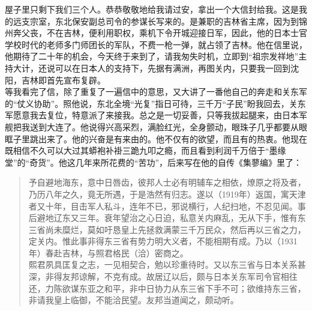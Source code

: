 屋子里只剩下我们三个人。恭恭敬敬地给我请过安，拿出一个大信封给我。这是我的远支宗室，东北保安副总司令的参谋长写来的。是兼职的吉林省主席，因为到锦州奔父丧，不在吉林，便利用职权，乘机下令开城迎接日军，因此，他的日本士官学校时代的老师多门师团长的军队，不费一枪一弹，就占领了吉林。他在信里说，他期待了二十年的机会，今天终于来到了，请我匆失时机，立即到“祖宗发祥地”主持大计，还说可以在日本人的支持下，先据有满洲，再图关内，只要我一回到沈阳，吉林即首先宣布复辟。\\

等我看完了信，除了重复了一遍信中的意思，又大讲了一番他自己的奔走和关东军的“仗义协助”。照他说，东北全境“光复”指日可待，三千万“子民”盼我回去，关东军愿意我去复位，特意派了来接我。总之是一切妥善，只等我拔起腿来，由日本军舰把我送到大连了。他说得兴高采烈，满脸红光，全身颤动，眼珠子几乎都要从眼眶子里跳出来了。他的兴奋是有来由的。他不仅有的欲望，而且有的热衷。他现在既相信不久可以大过其蟒袍补褂三跪九叩之瘾，而且看到利润千万倍于“墨缘堂”的“奇货”。他这几年来所花费的“苦功”，后来写在他的自传《集蓼编》里了：\\

\begin{quote}
	予自避地海东，意中日唇齿，彼邦人士必有明辅车之相依，燎原之将及者，乃历八年之久，竟无所遇，于是浩然有归志。遂以（1919年）返国，寓天津者又十年，目击军人私斗，连年不已，邪说横行，人纪扫地，不忍见闻。事后避地辽东又三年。衰年望治之心日迫，私意关内麻乱，无从下手，惟有东三省尚未糜烂，莫如吁恳皇上先拯救满蒙三千万民众，然后再以三省之力，定关内。惟此事非得东三省有势力明大义者，不能相期有成。乃以（1931年）春赴吉林，与照君格民（洽）密商之。\\

熙君夙具匡复之志，一见相契合，勉以珍重待时。又以东三省与日本关系甚深，非得友邦谅解，不克有成。故居辽以后，颇与日本关东军司令官相往还，力陈欲谋东亚之和平，非中日协力从东三省下手不可；欲维持东三省，非请我皇上临御，不能洽民望。友邦当道闻之，颇动听。\\
\end{quote}

